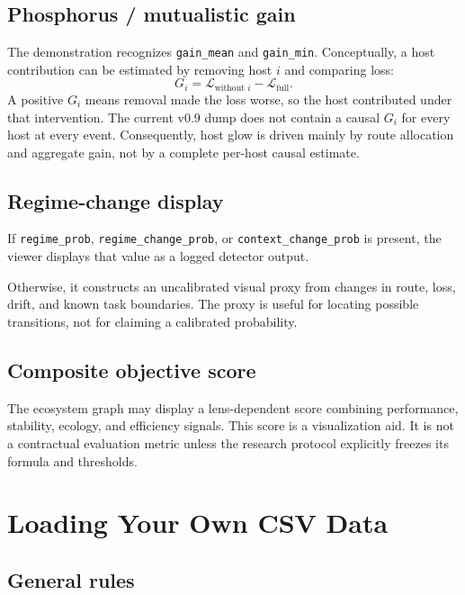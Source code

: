 \documentclass[11pt,a4paper]{article}
\newcommand{\code}[1]{\texttt{#1}}
\begin{document}
\subsection{Phosphorus / mutualistic gain}

The demonstration recognizes \code{gain\_mean} and \code{gain\_min}. Conceptually, a host contribution can be estimated by removing host $i$ and comparing loss:
\[
  G_i = \mathcal{L}_{\text{without }i} - \mathcal{L}_{\text{full}}.
\]
A positive $G_i$ means removal made the loss worse, so the host contributed under that intervention. The current v0.9 dump does not contain a causal $G_i$ for every host at every event. Consequently, host glow is driven mainly by route allocation and aggregate gain, not by a complete per-host causal estimate.

\subsection{Regime-change display}

If \code{regime\_prob}, \code{regime\_change\_prob}, or \code{context\_change\_prob} is present, the viewer displays that value as a logged detector output.

Otherwise, it constructs an uncalibrated visual proxy from changes in route, loss, drift, and known task boundaries. The proxy is useful for locating possible transitions, not for claiming a calibrated probability.

\subsection{Composite objective score}

The ecosystem graph may display a lens-dependent score combining performance, stability, ecology, and efficiency signals. This score is a visualization aid. It is not a contractual evaluation metric unless the research protocol explicitly freezes its formula and thresholds.

\section{Loading Your Own CSV Data}

\subsection{General rules}
\end{document}
